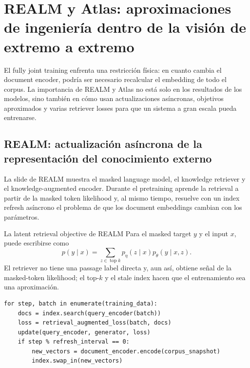 \section{REALM y Atlas: aproximaciones de ingeniería dentro de la visión de extremo a extremo}

El fully joint training enfrenta una restricción física: en cuanto cambia el document encoder, podría ser necesario recalcular el embedding de todo el corpus. La importancia de REALM y Atlas no está solo en los resultados de los modelos, sino también en cómo usan actualizaciones asíncronas, objetivos aproximados y varias retriever losses para que un sistema a gran escala pueda entrenarse.

\subsection{REALM: actualización asíncrona de la representación del conocimiento externo}

La slide de REALM muestra el masked language model, el knowledge retriever y el knowledge-augmented encoder. Durante el pretraining aprende la retrieval a partir de la masked token likelihood y, al mismo tiempo, resuelve con un index refresh asíncrono el problema de que los document embeddings cambian con los parámetros.


\begin{importantbox}{La latent retrieval objective de REALM}
Para el masked target $y$ y el input $x$, puede escribirse como
\[
p(y\mid x)=\sum_{z\in\operatorname{top}k}p_\eta(z\mid x)
p_\theta(y\mid x,z).
\]
El retriever no tiene una passage label directa y, aun así, obtiene señal de la masked-token likelihood; el top-$k$ y el stale index hacen que el entrenamiento sea una aproximación.
\end{importantbox}

\begin{lstlisting}[caption={Esqueleto de entrenamiento con document-index refresh asíncrono}]
for step, batch in enumerate(training_data):
    docs = index.search(query_encoder(batch))
    loss = retrieval_augmented_loss(batch, docs)
    update(query_encoder, generator, loss)
    if step % refresh_interval == 0:
        new_vectors = document_encoder.encode(corpus_snapshot)
        index.swap_in(new_vectors)
\end{lstlisting}

